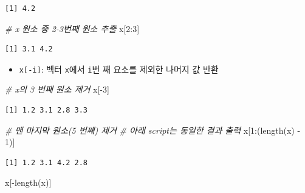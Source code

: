 \documentclass[
  11pt,
]{krantz}
\newenvironment{Shaded}{\begin{snugshade}}{\end{snugshade}}
\newcommand{\CommentTok}[1]{\textcolor[rgb]{0.37,0.37,0.37}{\textit{#1}}}
\newcommand{\DecValTok}[1]{\textcolor[rgb]{0.06,0.06,0.06}{#1}}
\newcommand{\FunctionTok}[1]{\textcolor[rgb]{0,0,0}{#1}}
\newcommand{\NormalTok}[1]{#1}
\newcommand{\SpecialCharTok}[1]{\textcolor[rgb]{0,0,0}{#1}}
\providecommand{\tightlist}{%
  \setlength{\itemsep}{0pt}\setlength{\parskip}{0pt}}
\begin{document}
\begin{verbatim}
[1] 4.2
\end{verbatim}

\begin{Shaded}
\begin{Highlighting}[]
\CommentTok{\# x 원소 중 2{-}3번째 원소 추출}
\NormalTok{x[}\DecValTok{2}\SpecialCharTok{:}\DecValTok{3}\NormalTok{]}
\end{Highlighting}
\end{Shaded}

\begin{verbatim}
[1] 3.1 4.2
\end{verbatim}

\normalsize

\begin{itemize}
\tightlist
\item
  \texttt{x{[}-i{]}}: 벡터 \texttt{x}에서 \texttt{i}번 째 요소를 제외한 나머지 값 반환
\end{itemize}

\footnotesize

\begin{Shaded}
\begin{Highlighting}[]
\CommentTok{\# x의 3 번째 원소 제거}
\NormalTok{x[}\SpecialCharTok{{-}}\DecValTok{3}\NormalTok{]}
\end{Highlighting}
\end{Shaded}

\begin{verbatim}
[1] 1.2 3.1 2.8 3.3
\end{verbatim}

\begin{Shaded}
\begin{Highlighting}[]
\CommentTok{\# 맨 마지막 원소(5 번째) 제거}
\CommentTok{\# 아래 script는 동일한 결과 출력}
\NormalTok{x[}\DecValTok{1}\SpecialCharTok{:}\NormalTok{(}\FunctionTok{length}\NormalTok{(x) }\SpecialCharTok{{-}} \DecValTok{1}\NormalTok{)]}
\end{Highlighting}
\end{Shaded}

\begin{verbatim}
[1] 1.2 3.1 4.2 2.8
\end{verbatim}

\begin{Shaded}
\begin{Highlighting}[]
\NormalTok{x[}\SpecialCharTok{{-}}\FunctionTok{length}\NormalTok{(x)]}
\end{Highlighting}
\end{Shaded}
\end{document}
